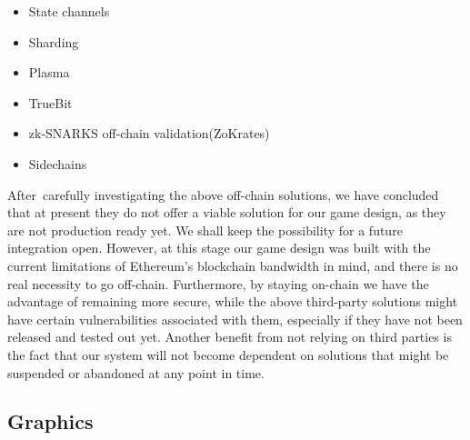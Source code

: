 \documentclass[12pt]{article}
\begin{document}
\begin{itemize}
	\item State channels \par

	\item Sharding\par

	\item Plasma  \cite{Josh_Stark__2018_February_12}\par

	\item TrueBit\par

	\item zk-SNARKS off-chain validation(ZoKrates) \cite{Jacob_Eberhardt_2018} \par

	\item Sidechains \cite{Adam_Back_et_al_2014}
\end{itemize}\par


\vspace{\baselineskip}
After\ carefully investigating the above off-chain solutions, we have concluded that at present they do not offer a viable solution for our game design, as they are not production ready yet. We shall keep the possibility for a future integration open. However, at this stage our game design was built with the current limitations of  Ethereum’s blockchain bandwidth in mind, and there is no real necessity to go off-chain. Furthermore, by staying on-chain we have the advantage of remaining more secure, while the above third-party solutions might have certain vulnerabilities associated with them, especially if they have not been released and tested out yet. Another benefit from not relying on third parties is the fact that our system will not become dependent on solutions that might be suspended or abandoned at any point in time. \par






\vspace{\baselineskip}\subsection{Graphics}
  \label{Graphics}  \par
\end{document}
